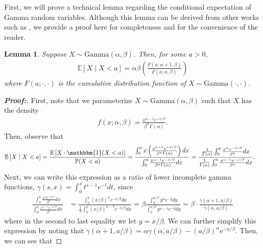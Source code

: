 \documentclass[11pt,twoside]{article}
\newtheorem{lemma}{Lemma}
\theoremstyle{definition}
\theoremstyle{remark}
\begin{document}
First, we will prove a technical lemma regarding the conditional expectation of Gamma random variables. Although this lemma can be derived from other works such as \cite{chapman_truncated_gamma}, we provide a proof here for completeness and for the convenience of the reader.
\begin{lemma} \label{Gamma_cond_exp}
    Suppose $X \sim \text{Gamma}(\alpha, \beta)$. Then, for some $a > 0$,
    \begin{align*}
        \mathbb{E}\left[X \mid X < a \right] = \alpha \beta \left(\frac{F(a; \alpha + 1, \beta)}{F(a; \alpha, \beta)}\right)
    \end{align*}
    where $F(a; \cdot, \cdot)$ is the cumulative distribution function of $X \sim \text{Gamma}(\cdot, \cdot)$.
\end{lemma}
\begin{proof}[\textbf{Proof:}] First, note that we parameterize $X \sim \text{Gamma}(\alpha, \beta)$ such that $X$ has the density
\begin{align*}
    f(x; \alpha, \beta) = \frac{x^{\alpha - 1} e^{- x / \beta}}{\beta^\alpha \Gamma(\alpha)}.
\end{align*}
Then, observe that
\begin{align*}
    \mathbb{E}\left[X \mid X < a \right] &= \frac{\mathbb{E}\left[X \cdot \mathbbm{1}(X < a) \right]}{\mathbb{P}(X < a)} = \frac{\int^a_0 x \left( \frac{x^{\alpha - 1} e^{- x / \beta}}{\beta^\alpha \Gamma(\alpha)}  \right) dx}{\int^a_0 \frac{x^{\alpha - 1} e^{- x / \beta}}{\beta^\alpha \Gamma(\alpha)} dx} = \frac{\frac{1}{\Gamma(\alpha)}\int^a_0  \frac{x^{\alpha} e^{- x / \beta}}{\beta^\alpha }  dx}{\frac{1}{\Gamma(\alpha)}\int^a_0 \frac{x^{\alpha - 1} e^{- x / \beta}}{\beta^\alpha } dx}.
\end{align*}
Next, we can write this expression as a ratio of lower incomplete gamma functions, $\gamma(s, x) = \int^x_0 t^{s-1} e^{-t} dt$, since
\begin{align*}
  \frac{\int^a_0  \frac{x^{\alpha} e^{- x / \beta}}{\beta^\alpha }  dx}{\int^a_0 \frac{x^{\alpha - 1} e^{- x / \beta}}{\beta^\alpha } dx}  &=    \frac{\int^a_0 (x / \beta)^{\alpha} e^{- x / \beta}  dx}{\frac{1}{\beta}\int^a_0 (x / \beta)^{\alpha - 1} e^{- x / \beta} dx} = \beta \frac{\int^{a / \beta}_0 y^{\alpha} e^{- y}  dy}{\int^{a / \beta}_0 y^{\alpha - 1} e^{- y} dy} = \beta \cdot \frac{\gamma(\alpha + 1, a / \beta)}{\gamma(\alpha, a / \beta)}
\end{align*}
where in the second to last equality we let $y = x / \beta$. We can further simplify this expression by noting that $\gamma(\alpha + 1, a / \beta) = \alpha \gamma( \alpha, a / \beta) - (a / \beta)^\alpha e^{- a / \beta}$. Then, we can see that

\end{proof}
\end{document}
